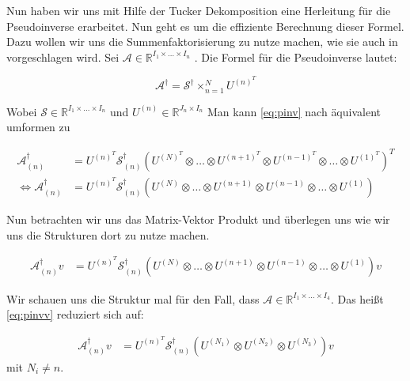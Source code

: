 \newpage
Nun haben wir uns mit Hilfe der Tucker Dekomposition eine Herleitung für die Pseudoinverse erarbeitet. Nun geht es um die effiziente Berechnung dieser Formel. Dazu wollen wir uns die Summenfaktorisierung zu nutze machen, wie sie auch in \cite[9-11]{Teachlet} vorgeschlagen wird.
Sei $\mathcal{A} \in \mathbb{R}^{I_{1} \times \dots \times I_{n}}$ .
Die Formel für die Pseudoinverse lautet:

\begin{equation} \label{eq:pinv}
\mathcal{A}^{\dagger} = \mathcal{S}^{\dagger} \times_{n=1}^{N} U^{ (n) ^{T} }
\end{equation}

Wobei $\mathcal{S} \in \mathbb{R}^{I_{1} \times \dots \times I_{n}}$ und $U^{(n)} \in \mathbb{R}^{J_{n} \times I_{n}}$
Man kann \ref{eq:pinv} nach \cite[462]{Kolda} äquivalent umformen zu

\begin{equation}
\begin{aligned}
\mathcal{A}^{\dagger}_{(n)}  &= U^{ (n) ^{T} }  \mathcal{S}^{\dagger}_{(n)} ( U^{ (N) ^{T} } \otimes \dots \otimes U^{ (n+1) ^{T} } \otimes U^{ (n-1) ^{T} } \otimes \dots \otimes U^{ (1) ^{T} })^{T} \\ \iff
\mathcal{A}^{\dagger}_{(n)} &= U^{ (n) ^{T} }  \mathcal{S}^{\dagger}_{(n)} ( U^{ (N)  } \otimes \dots \otimes U^{ (n+1) } \otimes U^{ (n-1) } \otimes \dots \otimes U^{ (1) })
\end{aligned}
\end{equation}

Nun betrachten wir uns das Matrix-Vektor Produkt und überlegen uns wie wir uns die Strukturen dort zu nutze machen.

\begin{equation} \label{eq:pinvv}
\begin{aligned}
\mathcal{A}^{\dagger}_{(n)}v&= U^{ (n) ^{T} }  \mathcal{S}^{\dagger}_{(n)} ( U^{ (N)  } \otimes \dots \otimes U^{ (n+1) } \otimes U^{ (n-1) } \otimes \dots \otimes U^{ (1) }) v
\end{aligned}
\end{equation}

Wir schauen uns die Struktur mal für den Fall, dass $\mathcal{A} \in \mathbb{R}^{I_{1} \times \dots \times I_{4}}$. Das heißt \ref{eq:pinvv} reduziert sich auf:

\begin{equation} \label{eq:pinvcase}
\begin{aligned}
\mathcal{A}^{\dagger}_{(n)}v&= U^{ (n) ^{T} }  \mathcal{S}^{\dagger}_{(n)} ( U^{ (N_{1})  } \otimes U^{ (N_{2})}  \otimes U^{ (N_{3}) }) v
\end{aligned}
\end{equation}
mit $N_{i} \neq n$.

